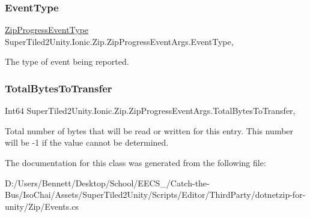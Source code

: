 \mbox{\label{class_super_tiled2_unity_1_1_ionic_1_1_zip_1_1_zip_progress_event_args_a6d4aebfeab7f649887bf1994b5258a15}} 
\subsubsection{\texorpdfstring{Event\+Type}{EventType}}
{\footnotesize\ttfamily \mbox{\hyperlink{namespace_super_tiled2_unity_1_1_ionic_1_1_zip_a6584db8196e626ddfc455e74d31a841f}{Zip\+Progress\+Event\+Type}} Super\+Tiled2\+Unity.\+Ionic.\+Zip.\+Zip\+Progress\+Event\+Args.\+Event\+Type\hspace{0.3cm}{\ttfamily [get]}, {\ttfamily [set]}}



The type of event being reported. 

\mbox{\label{class_super_tiled2_unity_1_1_ionic_1_1_zip_1_1_zip_progress_event_args_a86555bef7cd829c35b74816bb1113692}} 
\subsubsection{\texorpdfstring{Total\+Bytes\+To\+Transfer}{TotalBytesToTransfer}}
{\footnotesize\ttfamily Int64 Super\+Tiled2\+Unity.\+Ionic.\+Zip.\+Zip\+Progress\+Event\+Args.\+Total\+Bytes\+To\+Transfer\hspace{0.3cm}{\ttfamily [get]}, {\ttfamily [set]}}



Total number of bytes that will be read or written for this entry. This number will be -\/1 if the value cannot be determined. 



The documentation for this class was generated from the following file\+:\begin{DoxyCompactItemize}
\item 
D\+:/\+Users/\+Bennett/\+Desktop/\+School/\+E\+E\+C\+S\+\_/\+Catch-\/the-\/\+Bus/\+Iso\+Chai/\+Assets/\+Super\+Tiled2\+Unity/\+Scripts/\+Editor/\+Third\+Party/dotnetzip-\/for-\/unity/\+Zip/Events.\+cs\end{DoxyCompactItemize}
